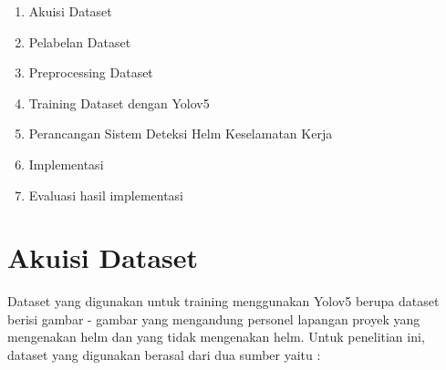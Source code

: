 \begin{enumerate}[nolistsep]
  \item Akuisi Dataset
  \item Pelabelan Dataset
  \item Preprocessing Dataset
  \item Training Dataset dengan Yolov5
  \item Perancangan Sistem Deteksi Helm Keselamatan Kerja
  \item Implementasi
  \item Evaluasi hasil implementasi
\end{enumerate}


\section{Akuisi Dataset}
\label{sec:akuisisidataset}

Dataset yang digunakan untuk training menggunakan Yolov5 berupa dataset berisi gambar - gambar yang mengandung personel lapangan proyek yang mengenakan helm dan yang tidak mengenakan helm. Untuk penelitian ini, dataset yang digunakan berasal dari dua sumber yaitu :

